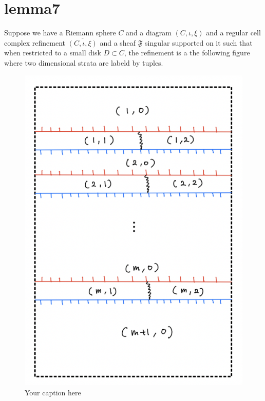 \section{lemma7}
\begin{lemma}
\end{lemma}

Suppose we have a Riemann sphere $C$ and a diagram $(C,\iota, \xi)$ and a regular cell complex refinement $\overline{(C,\iota, \xi)}$ and a sheaf $\mathfrak{F}$ singular supported on it such that when restricted to a small disk $D\subset C$, the refinement is a the following figure where two dimensional strata are labeld by tuples.

\begin{figure}[H] %
    \centering
    \includegraphics[width=\linewidth]{diagrams/lemma7/1.png} %
    \caption{Your caption here}
    \label{fig:your-label}
\end{figure}

